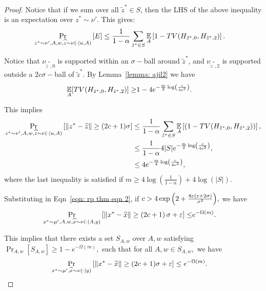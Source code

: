 \begin{proof}
	Notice that if we sum over all $\tilde{z}^* \in S $, then the LHS
	of the above inequality is an expectation over $z^* \sim \nu'$. This
	gives:
    \begin{align*} 
      \Pr_{z^* \sim \nu', A , w, \widehat{z} \sim \nu(\cdot | u,A)} \left[ E \right] & \leq \frac{1}{1-\alpha} \sum_{\tilde{z}^* \in S} \operatorname*{\mathbb{E}}_{A} \left[ 1 - TV(H_{\tilde{z}^*, 0}, H_{\tilde{z}^*,2}) \right].
    \end{align*}

    Notice that $\nu_{\tilde{z}^*,0}$ is supported within an $\sigma-$ball around $\tilde{z}^*$, and $\nu_{\tilde{z}^*,2}$ is supported outside a $2c\sigma-$ball of $\tilde{z}^*$. By Lemma~\ref{lemma: ajil2} we have 
    \begin{align*}
			\operatorname*{\mathbb{E}}_A [TV(H_{\tilde{z}^*,0}, H_{\tilde{z}^*,2})] \geq & 1 - 4 e^{-\frac{m}{2}\log\left( \frac{c}{4e^2} \right)}.
    \end{align*}

    This implies 
    \begin{align*}
      \Pr_{z^*\sim \nu', A, w, \widehat{z} \sim \nu( \cdot | u, A )}\left[\| z^* - \widehat{z} \| \geq (2c+1)\sigma \right] & \leq  \frac{1}{1-\alpha} \sum_{\tilde{z}^*\in S} \operatorname*{\mathbb{E}}_A \left[ ( 1 - TV(H_{\tilde{z}^*, 0}, H_{\tilde{z}^*,2})) \right], \\
      & \leq \frac{1}{1-\alpha}4 |S|  e^{-\frac{m}{2}\log\left( \frac{c}{4e^2} \right)},\\
			& \leq 4 e^{-\frac{m}{4}\log\left( \frac{c}{4e^2} \right)},
    \end{align*}
		where the last inequality is satisfied if $m \geq 4 \log\left(\frac{1}{1-\alpha}\right) + 4\log\left(|S|\right).$

		Substituting in Eqn~\eqref{eqn: rp thm eqn 2}, if $c > 4 \exp{\left( 2+  \frac{8\varepsilon\left( \varepsilon+ 2\sigma \right)}{\sigma^2} \right)},$ we have
		\begin{align*}
		  \Pr_{x^*\sim \mu' , A , w, \widehat{x} \sim \nu( \cdot | A, y)} \left[ \|x^* - \widehat{x}\| \geq \left( 2c + 1 \right)\sigma + \varepsilon  \right] \leq & e^{-\Omega(m)}.
		\end{align*}


		This implies that there exists a set $S_{A,w}$ over $A,w$ satisfying $\Pr_{A,w}[S_{A,w}] \geq 1 - e^{-\Omega(m)},$ such that for all $A , w \in S_{A, w},$ we have
		\begin{align*}
		  \Pr_{x^*\sim \mu', \widehat{x} \sim \nu( \cdot | y)}\left[\| x^* - \widehat{x} \| \geq (2c+1)\sigma + \varepsilon \right] & \leq  e^{-\Omega(m)}.
		\end{align*}


\end{proof}

